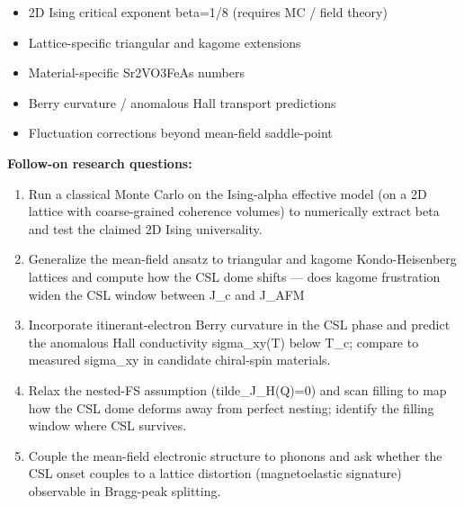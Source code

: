 \begin{itemize}[leftmargin=1.4em,itemsep=0.2em,topsep=0.2em]
\item 2D Ising critical exponent beta=1/8 (requires MC / field theory)
\item Lattice-specific triangular and kagome extensions
\item Material-specific Sr2VO3FeAs numbers
\item Berry curvature / anomalous Hall transport predictions
\item Fluctuation corrections beyond mean-field saddle-point
\end{itemize}\noindent\textbf{Follow-on research questions:}
\begin{enumerate}[leftmargin=1.6em,itemsep=0.2em,topsep=0.2em,label=Q\arabic*.]
\item Run a classical Monte Carlo on the Ising-alpha effective model (on a 2D lattice with coarse-grained coherence volumes) to numerically extract beta and test the claimed 2D Ising universality.
\item Generalize the mean-field ansatz to triangular and kagome Kondo-Heisenberg lattices and compute how the CSL dome shifts --- does kagome frustration widen the CSL window between J\_c and J\_AFM
\item Incorporate itinerant-electron Berry curvature in the CSL phase and predict the anomalous Hall conductivity sigma\_xy(T) below T\_c; compare to measured sigma\_xy in candidate chiral-spin materials.
\item Relax the nested-FS assumption (tilde\_J\_H(Q)=0) and scan filling to map how the CSL dome deforms away from perfect nesting; identify the filling window where CSL survives.
\item Couple the mean-field electronic structure to phonons and ask whether the CSL onset couples to a lattice distortion (magnetoelastic signature) observable in Bragg-peak splitting.
\end{enumerate}

